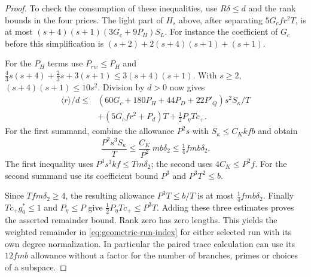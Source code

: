 \begin{proof}
To check the consumption of these inequalities, use
\(R\delta\le d\) and the rank bounds in the four prices.
The light part of \(H_s\) above, after separating
\(5G_c fr^2T\), is at most
\((s+4)(s+1)(3G_c+9P_H) S_L\).
For instance the coefficient of \(G_c\) before this
simplification is
\((s+2)+2(s+4)(s+1)+(s+1)\).

For the \(P_H\) terms use \(P_{rw}\le P_H\) and
\(\tfrac43s(s+4)+\tfrac23s+3(s+1)
 \le3(s+4)(s+1)\). With \(s\ge2\),
\((s+4)(s+1)\le10s^2\). Division by \(d>0\) now gives
\begin{align*}
 \langle r\rangle/d\le{}&
 (60G_c+180P_H+44P_D+22P'_Q)s^2 S_\kappa/T\\
 &+(5G_cfr^2+P_d)T+\tfrac12 P_\eta T c_+ .
\end{align*}
For the first summand, combine the allowance
\(P^2s\) with \(S_\kappa\le C_K kfb\) and obtain
\[
 \frac{P^2s^3S_\kappa}{T}
 \le\frac{C_K}{P^2}\,mb\delta_2
 \le\tfrac14 fmb\delta_2 .
\]
The first inequality uses \(P^4s^3kf\le Tm\delta_2\);
the second uses \(4C_K\le P^2f\).
For the second summand use its coefficient bound \(P^3\)
and \(P^3T^2\le b\).

Since \(Tf m\delta_2\ge4\), the
resulting allowance \(P^3T\le b/T\) is at most
\(\tfrac14 fmb\delta_2\). Finally \(Tc_+g_0^*\le1\)
and \(P_\eta\le P\) give
\(\tfrac12P_\eta T c_+\le P^3T\).
Adding these three estimates proves the asserted remainder bound.
Rank zero has zero lengths. This yields the weighted
remainder in \eqref{eq:geometric-run-index} for either
selected run with its own degree normalization. In
particular the paired trace calculation can use its
\(12fmb\) allowance without a factor for the number of
branches, primes or choices of a subspace.
\end{proof}
